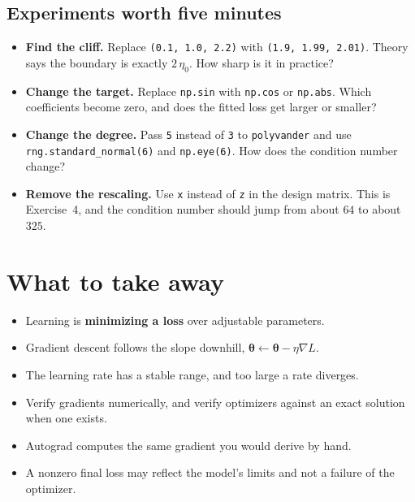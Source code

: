 \documentclass[11pt]{article}
\newcommand{\vth}{\bm{\theta}}
\newcommand{\grad}{\nabla}
\begin{document}
\subsection{Experiments worth five minutes}
\begin{itemize}[nosep]
  \item \textbf{Find the cliff.} Replace \texttt{(0.1, 1.0, 2.2)} with \texttt{(1.9, 1.99, 2.01)}. Theory says the boundary is exactly $2\,\eta_0$. How sharp is it in practice?
  \item \textbf{Change the target.} Replace \texttt{np.sin} with \texttt{np.cos} or \texttt{np.abs}. Which coefficients become zero, and does the fitted loss get larger or smaller?
  \item \textbf{Change the degree.} Pass \texttt{5} instead of \texttt{3} to \texttt{polyvander} and use \texttt{rng.standard\_normal(6)} and \texttt{np.eye(6)}. How does the condition number change?
  \item \textbf{Remove the rescaling.} Use \texttt{x} instead of \texttt{z} in the design matrix. This is Exercise~4, and the condition number should jump from about $64$ to about $325$.
\end{itemize}

\section{What to take away}
\begin{keybox}[Summary]
\begin{itemize}[nosep]
  \item Learning is \textbf{minimizing a loss} over adjustable parameters.
  \item Gradient descent follows the slope downhill, $\vth\leftarrow\vth-\eta\grad L$.
  \item The learning rate has a stable range, and too large a rate diverges.
  \item Verify gradients numerically, and verify optimizers against an exact solution when one exists.
  \item Autograd computes the same gradient you would derive by hand.
  \item A nonzero final loss may reflect the model's limits and not a failure of the optimizer.
\end{itemize}
\end{keybox}
\end{document}

